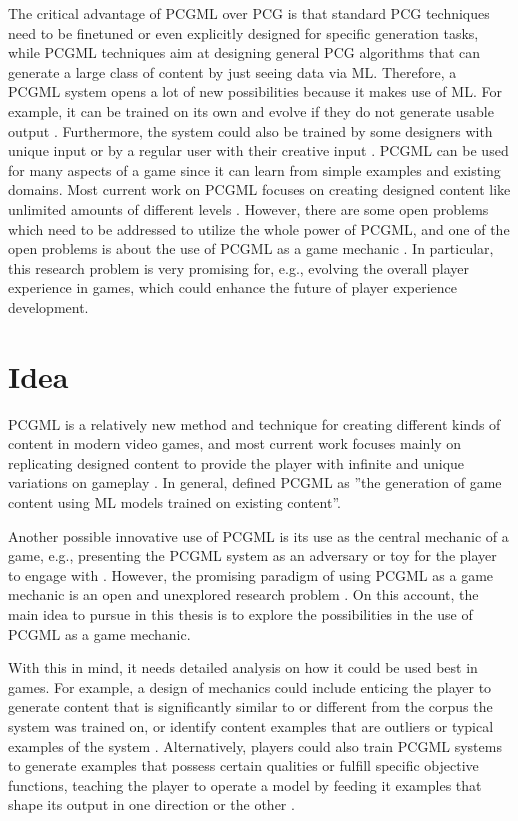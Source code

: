 \documentclass[MGS,Master,english]{twbook}%
\begin{document}
The critical advantage of \ac{PCGML} over \ac{PCG} is that standard \ac{PCG} techniques need to be finetuned or even explicitly designed for specific generation tasks, while \ac{PCGML} techniques aim at designing general \ac{PCG} algorithms that can generate a large class of content by just seeing data via \ac{ML}. Therefore, a \ac{PCGML} system opens a lot of new possibilities because it makes use of \ac{ML}. For example, it can be trained on its own and evolve if they do not generate usable output \cite{pcgml::paper}. Furthermore, the system could also be trained by some designers with unique input or by a regular user with their creative input \cite{pcgml::paper}. \ac{PCGML} can be used for many aspects of a game since it can learn from simple examples and existing domains. Most current work on \ac{PCGML} focuses on creating designed content like unlimited amounts of different levels \cite{pcgml::paper}. However, there are some open problems which need to be addressed to utilize the whole power of \ac{PCGML}, and one of the open problems is about the use of \ac{PCGML} as a game mechanic \cite{pcgml::paper}. In particular, this research problem is very promising for, e.g., evolving the overall player experience in games, which could enhance the future of player experience development.

\section{Idea}
\ac{PCGML} is a relatively new method and technique for creating different kinds of content in modern video games, and most current work focuses mainly on replicating designed content to provide the player with infinite and unique variations on gameplay \cite{pcgml::paper}. In general, \citep[p. 1]{pcgml::paper} defined \ac{PCGML} as ''the generation of game content using \ac{ML} models trained on existing content''. 

Another possible innovative use of \ac{PCGML} is its use as the central mechanic of a game, e.g., presenting the \ac{PCGML} system as an adversary or toy for the player to engage with  \cite{pcgml::paper}. However, the promising paradigm of using \ac{PCGML} as a game mechanic is an open and unexplored research problem \cite{pcgml::paper}. On this account, the main idea to pursue in this thesis is to explore the possibilities in the use of \ac{PCGML} as a game mechanic.

With this in mind, it needs detailed analysis on how it could be used best in games. For example, a design of mechanics could include enticing the player to generate content that is significantly similar to or different from the corpus the system was trained on, or identify content examples that are outliers or typical examples of the system \cite{pcgml::paper}. Alternatively, players could also train \ac{PCGML} systems to generate examples that possess certain qualities or fulfill specific objective functions, teaching the player to operate a model by feeding it examples that shape its output in one direction or the other \cite{pcgml::paper}.
\end{document}
